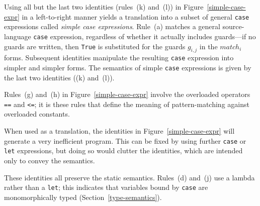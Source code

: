 Using all but the last two identities (rules~(k) and~(l)) in Figure~\ref{simple-case-expr}
in a left-to-right manner yields a translation into a
subset of general \mbox{\tt case} expressions called {\em simple case expressions}.%
Rule~(a) matches a general source-language
\mbox{\tt case} expression, regardless of whether it actually includes
guards---if no guards are written, then \mbox{\tt True} is substituted for the guards $g_{i,j}$
in the $match_i$ forms.
Subsequent identities manipulate the resulting \mbox{\tt case} expression into simpler
and simpler forms.
The semantics of simple \mbox{\tt case} expressions is 
given by the last two identities ((k) and~(l)).

Rules~(g) and~(h) in Figure~\ref{simple-case-expr} involve the
overloaded operators \mbox{\tt ==} and \mbox{\tt <=}; it is these rules that define the
meaning of pattern-matching against overloaded constants.

When used as a translation, the identities in
Figure~\ref{simple-case-expr} will generate a very inefficient
program.  This can be fixed by using further \mbox{\tt case} or \mbox{\tt let} 
expressions, but doing so 
would clutter the identities, which are intended only to convey the semantics.

These identities all preserve the static semantics.  Rules~(d) and~(j)
use a lambda rather than a \mbox{\tt let}; this indicates that variables bound
by \mbox{\tt case} are monomorphically typed (Section~\ref{type-semantics}).

